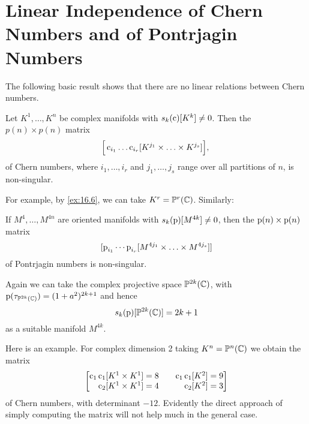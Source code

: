 \documentclass[../main]{subfiles}
\begin{document}
\section[Linear Independence of Chern Numbers and of\texorpdfstring{\\}{} Pontrjagin Numbers]{Linear Independence of Chern Numbers and of Pontrjagin Numbers}
The following basic result shows that there are no linear relations between Chern numbers.

\begin{theorem}[Thom]\label{thm:16.07} Let $K^{1}, \ldots, K^{n}$ be complex manifolds with \newline $s_{k}(\operatorname{c})[K^{k}] \neq 0$. Then the $p(n) \times p(n)$ matrix
\[
\Big[\operatorname{c}_{i_{1}} \ldots \operatorname{c}_{i_{r}}[K^{j_{1}} \times \ldots \times K^{j_{s}}]\Big] \text {, }
\]
of Chern numbers, where $i_{1}, \ldots, i_{r}$ and $j_{1}, \ldots, j_{s}$ range over all partitions of $n$, is non-singular.
\end{theorem}
For example, by \ref{ex:16.6}, we can take $K^{r}=\mathbb{P}^{r}(\mathbb{C})$. Similarly:

\begin{theorem}[Thom]\label{thm:16.08} If $M^{4}, \ldots, M^{4 n}$ are oriented manifolds with $s_{k}(\operatorname{p})[M^{4 k}] \neq 0$, then the $\operatorname{p}(n) \times \operatorname{p}(n)$ matrix
\[
[\operatorname{p}_{i_{1}} \cdots \operatorname{p}_{i_{r}}[M^{4 j_{1}} \times \ldots \times M^{4 j_{s}}]]
\]
of Pontrjagin numbers is non-singular.\end{theorem}

Again we can take the complex projective space $\mathbb{P}^{2 k}{(\mathbb{C})}$, with $\operatorname{p}(\tau_{\mathbb{P}^{2 k}{(\mathbb{C})}})= (1+a^{2})^{2 k+1}$ and hence
\[
s_{k}(\operatorname{p})[\mathbb{P}^{2 k}{(\mathbb{C})}]=2 k+1
\]
as a suitable manifold $M^{4 k}$.

Here is an example. For complex dimension 2 taking $K^{n}=\mathbb{P}^{n}(\mathbb{C})$ we obtain the matrix
\[
\begin{bmatrix}
\hfill\chernclass_{1} \chernclass_{1}[K^{1} \times K^{1}]=8 && \hfill\chernclass_{1} \chernclass_{1}[K^{2}]=9 \\
\hfill\chernclass_{2}[K^{1} \times K^{1}]=4 && \hfill\chernclass_{2}[K^{2}]=3
\end{bmatrix}
\]
of Chern numbers, with determinant $-12$. Evidently the direct approach of simply computing the matrix will not help much in the general case.
\end{document}
